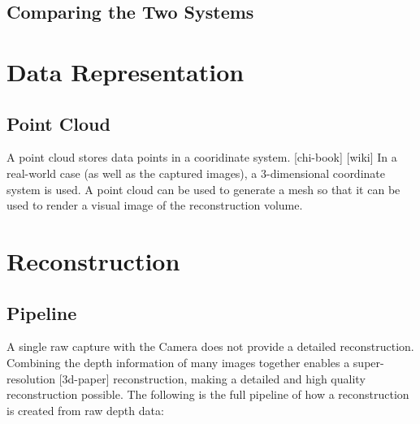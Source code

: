 \documentclass[11pt,openright,a4paper]{report}
\begin{document}
\subsection{Comparing the Two Systems}

\section{Data Representation}

\subsection{Point Cloud}
A point cloud stores data points in a cooridinate system. [chi-book] [wiki] In a real-world case (as well as the captured images), a 3-dimensional coordinate system is used. A point cloud can be used to generate a mesh so that it can be used to render a visual image of the reconstruction volume.

\section{Reconstruction}

\subsection{Pipeline}
A single raw capture with the Camera does not provide a detailed reconstruction. Combining the depth information of many images together enables a super-resolution [3d-paper] reconstruction, making a detailed and high quality reconstruction possible. The following is the full pipeline of how a reconstruction is created from raw depth data:
\end{document}
